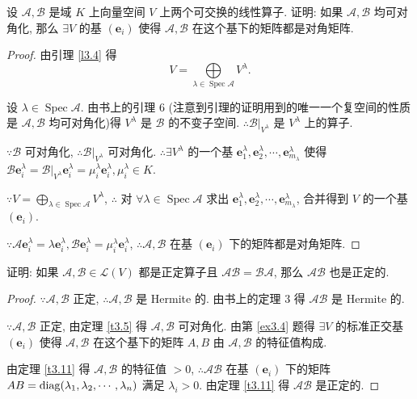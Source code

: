 \documentclass[color=black,device=normal,lang=cn,mode=geye]{elegantnote}
\begin{document}
\begin{exercise}\label{ex3.4}
    设 $\mathcal{A},\mathcal{B}$ 是域 $K$ 上向量空间 $V$ 上两个可交换的线性算子. 证明: 如果 $\mathcal{A},\mathcal{B}$ 均可对角化, 那么 $\exists V$ 的基 $(\boldsymbol{e}_i)$ 使得 $\mathcal{A},\mathcal{B}$ 在这个基下的矩阵都是对角矩阵.
\end{exercise}
\begin{proof}
    由引理 \ref{l3.4} 得
    \[V=\bigoplus\limits_{\lambda\in\operatorname{Spec}\mathcal{A}}V^\lambda.\]

    设 $\lambda\in\operatorname{Spec}\mathcal{A}$. 由书上的引理 6 (注意到引理的证明用到的唯一一个复空间的性质是 $\mathcal{A},\mathcal{B}$ 均可对角化)得 $V^\lambda$ 是 $\mathcal{B}$ 的不变子空间. $\therefore\mathcal{B}|_{V^\lambda}$ 是 $V^\lambda$ 上的算子.
    
    $\because\mathcal{B}$ 可对角化, $\therefore\mathcal{B}|_{V^\lambda}$ 可对角化. $\therefore\exists V^\lambda$ 的一个基 $\boldsymbol{e}^\lambda_1,\boldsymbol{e}^\lambda_2,\cdots,\boldsymbol{e}^\lambda_{m_\lambda}$ 使得 $\mathcal{B}\boldsymbol{e}^\lambda_i=\mathcal{B}|_{V^\lambda}\boldsymbol{e}^\lambda_i=\mu^\lambda_i\boldsymbol{e}^\lambda_i,\mu^\lambda_i\in K$.

    $\because V=\bigoplus\limits_{\lambda\in\operatorname{Spec}\mathcal{A}}V^\lambda$, $\therefore$ 对 $\forall\lambda\in\operatorname{Spec}\mathcal{A}$ 求出 $\boldsymbol{e}^\lambda_1,\boldsymbol{e}^\lambda_2,\cdots,\boldsymbol{e}^\lambda_{m_\lambda}$, 合并得到 $V$ 的一个基 $(\boldsymbol{e}_i)$.

    $\because\mathcal{A}\boldsymbol{e}^\lambda_i=\lambda\boldsymbol{e}^\lambda_i,\mathcal{B}\boldsymbol{e}^\lambda_i=\mu^\lambda_i\boldsymbol{e}^\lambda_i$, $\therefore\mathcal{A},\mathcal{B}$ 在基 $(\boldsymbol{e}_i)$ 下的矩阵都是对角矩阵.
\end{proof}
\begin{exercise}%
    证明: 如果 $\mathcal{A},\mathcal{B}\in\mathcal{L}(V)$ 都是正定算子且 $\mathcal{AB}=\mathcal{BA}$, 那么 $\mathcal{AB}$ 也是正定的.
\end{exercise}
\begin{proof}
    $\because\mathcal{A},\mathcal{B}$ 正定, $\therefore\mathcal{A},\mathcal{B}$ 是 Hermite 的. 由书上的定理 3 得 $\mathcal{AB}$ 是 Hermite 的.

    $\because\mathcal{A},\mathcal{B}$ 正定, 由定理 \ref{t3.5} 得 $\mathcal{A},\mathcal{B}$ 可对角化. 由第 \ref{ex3.4} 题得 $\exists V$ 的标准正交基 $(\boldsymbol{e}_i)$ 使得 $\mathcal{A},\mathcal{B}$ 在这个基下的矩阵 $A,B$ 由 $\mathcal{A},\mathcal{B}$ 的特征值构成.
    
    由定理 \ref{t3.11} 得 $\mathcal{A},\mathcal{B}$ 的特征值 $>0$, $\therefore\mathcal{AB}$ 在基 $(\boldsymbol{e}_i)$ 下的矩阵 $AB=\operatorname{diag} (\lambda_1,\lambda_2,\cdots,\lambda_n)$ 满足 $\lambda_i>0$. 由定理 \ref{t3.11} 得 $\mathcal{AB}$ 是正定的.
\end{proof}
\end{document}
